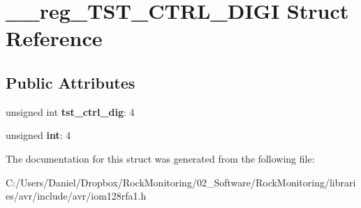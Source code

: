 \hypertarget{struct____reg___t_s_t___c_t_r_l___d_i_g_i}{}\section{\+\_\+\+\_\+reg\+\_\+\+T\+S\+T\+\_\+\+C\+T\+R\+L\+\_\+\+D\+I\+GI Struct Reference}
\label{struct____reg___t_s_t___c_t_r_l___d_i_g_i}
\subsection*{Public Attributes}
\begin{DoxyCompactItemize}
\item 
unsigned int {\bfseries tst\+\_\+ctrl\+\_\+dig}\+: 4\hypertarget{struct____reg___t_s_t___c_t_r_l___d_i_g_i_a9b21d9abd970fa4434572ea3f0c06449}{}\label{struct____reg___t_s_t___c_t_r_l___d_i_g_i_a9b21d9abd970fa4434572ea3f0c06449}

\item 
unsigned {\bfseries int}\+: 4\hypertarget{struct____reg___t_s_t___c_t_r_l___d_i_g_i_acfb4cab70f711e9b36fa02d97fb315ba}{}\label{struct____reg___t_s_t___c_t_r_l___d_i_g_i_acfb4cab70f711e9b36fa02d97fb315ba}

\end{DoxyCompactItemize}


The documentation for this struct was generated from the following file\+:\begin{DoxyCompactItemize}
\item 
C\+:/\+Users/\+Daniel/\+Dropbox/\+Rock\+Monitoring/02\+\_\+\+Software/\+Rock\+Monitoring/libraries/avr/include/avr/iom128rfa1.\+h\end{DoxyCompactItemize}
